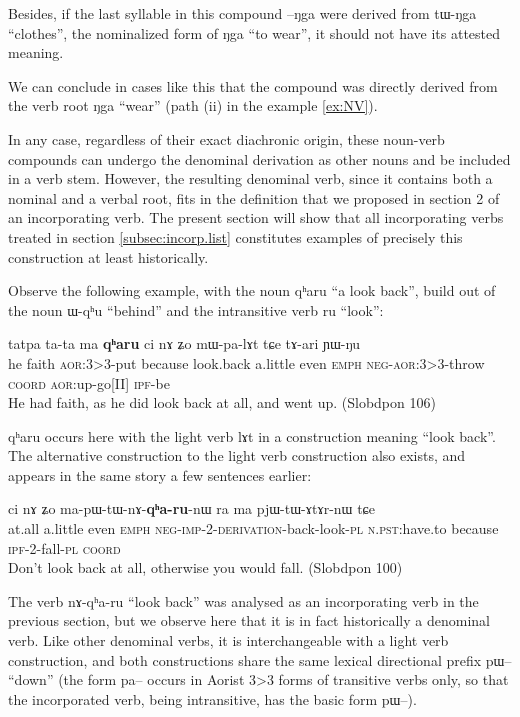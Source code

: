\documentclass[oldfontcommands,oneside,a4paper,11pt]{article}
\newcommand{\ipa}[1]{{\phon #1}} %
\newcommand{\aor}{\textsc{aor}}
\newcommand{\coord}{\textsc{coord}}
\newcommand{\emphat}{\textsc{emph}}
\newcommand{\imp}{\textsc{imp}}
\newcommand{\ipf}{\textsc{ipf}}
\newcommand{\negat}{\textsc{neg}}
\newcommand{\npst}{\textsc{n.pst}}
\newcommand{\pl}{\textsc{pl}}
\begin{document}
Besides, if the last syllable in this compound  --\ipa{ŋga} were derived from \ipa{tɯ-ŋga} ``clothes'', the  nominalized form of \ipa{ŋga} ``to wear'', it should  not have its attested meaning.

  We can conclude in cases like this that the compound was directly derived from the verb root \ipa{ŋga} ``wear'' (path (ii) in the example \ref{ex:NV}).
 
 In any case, regardless of their exact diachronic origin, these noun-verb compounds can undergo the denominal derivation as other nouns and be included in a verb stem. However, the resulting denominal verb, since it contains both a nominal and a verbal root, fits in the definition that we proposed in section 2 of an incorporating verb. The present section will show that all incorporating verbs treated in section \ref{subsec:incorp.list} constitutes examples of precisely this construction at least historically.

Observe the following example, with the noun \ipa{qʰaru} ``a look back'', build out of the noun \ipa{ɯ-qʰu} ``behind'' and the intransitive verb \ipa{ru} ``look'':
 \begin{exe}
\ex
\gll    \ipa{ɯʑo} \ipa{tatpa} \ipa{ta-ta} \ipa{ma} \textbf{\ipa{qʰaru}} \ipa{ci} \ipa{nɤ} \ipa{ʑo} \ipa{mɯ-pa-lɤt} \ipa{tɕe} \ipa{tɤ-ari} \ipa{ɲɯ-ŋu}	 \\
  he faith \aor{}:3>3-put because look.back a.little even \emphat{} \negat{}-\aor{}:3>3-throw \coord{} \aor{}:up-go[II] \ipf{}-be\\
 \glt  He had faith, as he did look back at all, and went up. (Slobdpon 106)
\end{exe}   
 \ipa{qʰaru} occurs here with the light verb \ipa{lɤt} in a construction meaning ``look back''. The alternative construction to the light verb construction also exists, and appears in the same story a few sentences earlier:
 
 
  \begin{exe}
\ex
\gll    \ipa{maka} \ipa{ci} \ipa{nɤ} \ipa{ʑo} \ipa{ma-pɯ-tɯ-nɤ-\textbf{qʰa-ru}-nɯ} \ipa{ra} \ipa{ma} \ipa{pjɯ-tɯ-ɤtɤr-nɯ} \ipa{tɕe}  \\
  at.all a.little even \emphat{} \negat{}-\imp{}-2-\textsc{derivation}-back-look-\pl{} \npst{}:have.to because \ipf{}-2-fall-\pl{} \coord{} \\
 \glt  Don't look back at all, otherwise you would fall. (Slobdpon 100)
\end{exe}   

The verb \ipa{nɤ-qʰa-ru} ``look back'' was analysed as an incorporating verb in the previous section, but we observe here that it is in fact historically a denominal verb. Like other denominal verbs, it is interchangeable with a light verb construction, and both constructions share the same lexical directional prefix \ipa{pɯ}-- ``down'' (the form \ipa{pa}-- occurs in Aorist 3>3 forms of transitive verbs only, so that the incorporated verb, being intransitive, has the basic form \ipa{pɯ}--).
\end{document}

